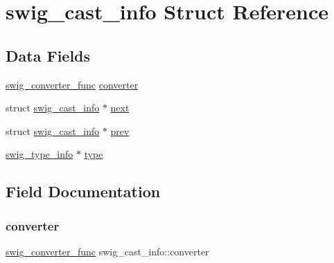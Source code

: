 \hypertarget{structswig__cast__info}{}\section{swig\+\_\+cast\+\_\+info Struct Reference}
\label{structswig__cast__info}
\subsection*{Data Fields}
\begin{DoxyCompactItemize}
\item 
\hyperlink{libstructural__wrap__python_8cpp_a9a51597c7c2041da303a65468011f59b}{swig\+\_\+converter\+\_\+func} \hyperlink{structswig__cast__info_aa630fddfbb1bf9c97a03f9479ba32f76}{converter}
\item 
struct \hyperlink{structswig__cast__info}{swig\+\_\+cast\+\_\+info} $\ast$ \hyperlink{structswig__cast__info_ae79c6fa058a9d908bbdac14db0c9db5e}{next}
\item 
struct \hyperlink{structswig__cast__info}{swig\+\_\+cast\+\_\+info} $\ast$ \hyperlink{structswig__cast__info_afc685bcf38a5a06c6601775138c5999c}{prev}
\item 
\hyperlink{structswig__type__info}{swig\+\_\+type\+\_\+info} $\ast$ \hyperlink{structswig__cast__info_a1c9023a301c8d6806209f4e10df6e9e0}{type}
\end{DoxyCompactItemize}


\subsection{Field Documentation}
\mbox{\label{structswig__cast__info_aa630fddfbb1bf9c97a03f9479ba32f76}} 
\subsubsection{\texorpdfstring{converter}{converter}}
{\footnotesize\ttfamily \hyperlink{libstructural__wrap__python_8cpp_a9a51597c7c2041da303a65468011f59b}{swig\+\_\+converter\+\_\+func} swig\+\_\+cast\+\_\+info\+::converter}

\mbox{\label{structswig__cast__info_ae79c6fa058a9d908bbdac14db0c9db5e}} 

